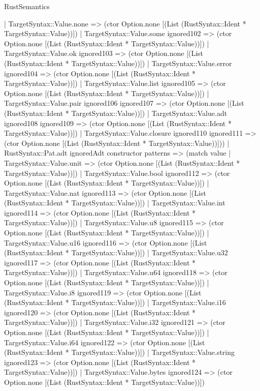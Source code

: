 \begin{lexlean}{RustSemantics}
\begin{semanticmodule}
{      | TargetSyntax::Value.none => (ctor Option.none [(List (RustSyntax::Ident * TargetSyntax::Value))])
      | TargetSyntax::Value.some ignored102 => (ctor Option.none [(List (RustSyntax::Ident * TargetSyntax::Value))])
      | TargetSyntax::Value.ok ignored103 => (ctor Option.none [(List (RustSyntax::Ident * TargetSyntax::Value))])
      | TargetSyntax::Value.error ignored104 => (ctor Option.none [(List (RustSyntax::Ident * TargetSyntax::Value))])
      | TargetSyntax::Value.list ignored105 => (ctor Option.none [(List (RustSyntax::Ident * TargetSyntax::Value))])
      | TargetSyntax::Value.pair ignored106 ignored107 => (ctor Option.none [(List (RustSyntax::Ident * TargetSyntax::Value))])
      | TargetSyntax::Value.adt ignored108 ignored109 => (ctor Option.none [(List (RustSyntax::Ident * TargetSyntax::Value))])
      | TargetSyntax::Value.closure ignored110 ignored111 => (ctor Option.none [(List (RustSyntax::Ident * TargetSyntax::Value))]))
    | RustSyntax::Pat.adt ignoredAdt constructor patterns => (match value
      | TargetSyntax::Value.unit => (ctor Option.none [(List (RustSyntax::Ident * TargetSyntax::Value))])
      | TargetSyntax::Value.bool ignored112 => (ctor Option.none [(List (RustSyntax::Ident * TargetSyntax::Value))])
      | TargetSyntax::Value.nat ignored113 => (ctor Option.none [(List (RustSyntax::Ident * TargetSyntax::Value))])
      | TargetSyntax::Value.int ignored114 => (ctor Option.none [(List (RustSyntax::Ident * TargetSyntax::Value))])
      | TargetSyntax::Value.u8 ignored115 => (ctor Option.none [(List (RustSyntax::Ident * TargetSyntax::Value))])
      | TargetSyntax::Value.u16 ignored116 => (ctor Option.none [(List (RustSyntax::Ident * TargetSyntax::Value))])
      | TargetSyntax::Value.u32 ignored117 => (ctor Option.none [(List (RustSyntax::Ident * TargetSyntax::Value))])
      | TargetSyntax::Value.u64 ignored118 => (ctor Option.none [(List (RustSyntax::Ident * TargetSyntax::Value))])
      | TargetSyntax::Value.i8 ignored119 => (ctor Option.none [(List (RustSyntax::Ident * TargetSyntax::Value))])
      | TargetSyntax::Value.i16 ignored120 => (ctor Option.none [(List (RustSyntax::Ident * TargetSyntax::Value))])
      | TargetSyntax::Value.i32 ignored121 => (ctor Option.none [(List (RustSyntax::Ident * TargetSyntax::Value))])
      | TargetSyntax::Value.i64 ignored122 => (ctor Option.none [(List (RustSyntax::Ident * TargetSyntax::Value))])
      | TargetSyntax::Value.string ignored123 => (ctor Option.none [(List (RustSyntax::Ident * TargetSyntax::Value))])
      | TargetSyntax::Value.bytes ignored124 => (ctor Option.none [(List (RustSyntax::Ident * TargetSyntax::Value))])
}
\end{semanticmodule}
\end{lexlean}
